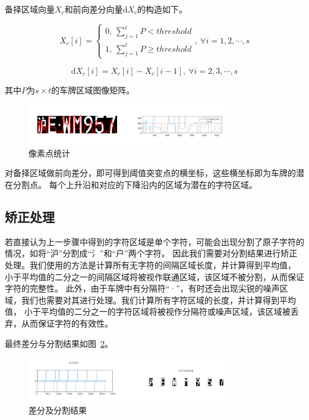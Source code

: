 \documentclass[utf8,a4paper]{ctexart}
\begin{document}
备择区域向量$X_c$和前向差分向量${\mathrm d} X_c$的构造如下。

\begin{equation}
    X_c[i] =
    \begin{cases}
        0,\  \sum_{j=1}^tP <threshold \\
        1,\  \sum_{j=1}^tP \geq threshold
    \end{cases},\ \forall i=1,2,\cdots,s
\end{equation}

\begin{equation}
    {\mathrm d} X_c[i] = X_c[i]-X_c[i-1],\ \forall i=2,3,\cdots,s
\end{equation}

其中$P$为$s\times t$的车牌区域图像矩阵。

\begin{figure}[h]
    \centering
    \includegraphics[width=0.8\textwidth]{./img/easy/双图.png}
    \caption{像素点统计}
    \label{fig:pixel_count}
\end{figure}

对备择区域做前向差分，即可得到阈值突变点的横坐标，这些横坐标即为车牌的潜在分割点。
每个上升沿和对应的下降沿内的区域为潜在的字符区域。

\subsection{矫正处理}
若直接认为上一步骤中得到的字符区域是单个字符，可能会出现分割了原子字符的情况，如将``沪''分割成``氵''和``户''两个字符。
因此我们需要对分割结果进行矫正处理。我们使用的方法是计算所有无字符的间隔区域长度，并计算得到平均值，
小于平均值的二分之一的间隔区域将被视作联通区域，该区域不被分割，从而保证字符的完整性。
此外，由于车牌中有分隔符``·''，有时还会出现尖锐的噪声区域，我们也需要对其进行处理。我们计算所有字符区域的长度，并计算得到平均值，
小于平均值的二分之一的字符区域将被视作分隔符或噪声区域，该区域被丢弃，从而保证字符的有效性。

最终差分与分割结果如图~\ref{fig:split_result}。

\begin{figure}[h]
    \centering
    \includegraphics[width=0.8\textwidth]{./img/easy/双图2.png}
    \caption{差分及分割结果}
    \label{fig:split_result}
\end{figure}
\end{document}
